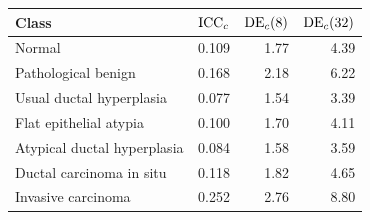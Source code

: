 \begin{tabular}{@{}p{9cm}rrr@{}}
\toprule
Class & $\operatorname{ICC}_c$ & $\mathrm{DE}_c(8)$ & $\mathrm{DE}_c(32)$ \\
\midrule
Normal & 0.109 & 1.77 & 4.39 \\
Pathological benign & 0.168 & 2.18 & 6.22 \\
Usual ductal hyperplasia & 0.077 & 1.54 & 3.39 \\
Flat epithelial atypia & 0.100 & 1.70 & 4.11 \\
Atypical ductal hyperplasia & 0.084 & 1.58 & 3.59 \\
Ductal carcinoma in situ & 0.118 & 1.82 & 4.65 \\
Invasive carcinoma & 0.252 & 2.76 & 8.80 \\
\bottomrule
\end{tabular}
